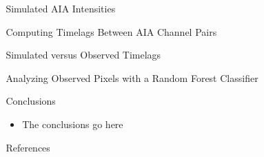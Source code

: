 \documentclass[final]{beamer}
\begin{document}
\begin{frame}
\begin{columns}[T]
\begin{column}{0.49\linewidth}
  \end{column}
  \begin{column}{0.49\linewidth}
    \begin{block}{Simulated AIA Intensities}
    \end{block}
    \begin{block}{Computing Timelags Between AIA Channel Pairs}
    \end{block}
    \begin{block}{Simulated versus Observed Timelags}
    \end{block}
    \begin{block}{Analyzing Observed Pixels with a Random Forest Classifier}
    \end{block}
    \begin{block}{Conclusions}
      \begin{itemize}
        \item The conclusions go here
      \end{itemize}
    \end{block}
    \begin{block}{References}
      \scriptsize
      \begin{multicols}{2}
        
        
      \end{multicols}
    \end{block}
  \end{column}
  \end{columns}
\end{frame}
\end{document}
